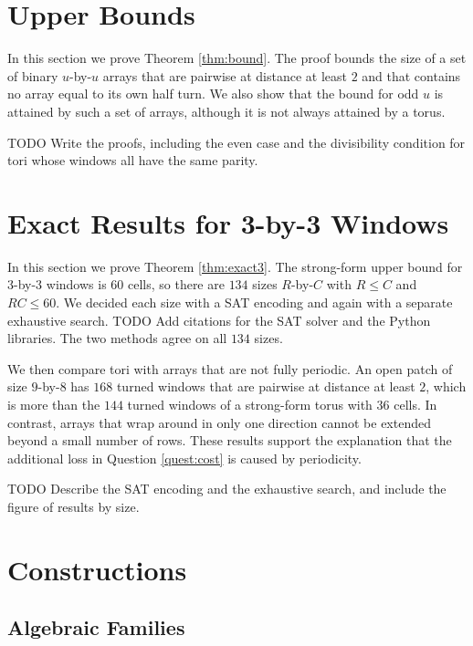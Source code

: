 \documentclass{lipics-v2021}
\newcommand{\todo}[1]{{\color{blue}TODO #1}}
\begin{document}
\section{Upper Bounds}
\label{sec:bounds}

In this section we prove Theorem \ref{thm:bound}.
The proof bounds the size of a set of binary $u$-by-$u$ arrays that are pairwise at distance at least $2$ and that contains no array equal to its own half turn.
We also show that the bound for odd $u$ is attained by such a set of arrays, although it is not always attained by a torus.

\todo{Write the proofs, including the even case and the divisibility condition for tori whose windows all have the same parity.}


\section{Exact Results for 3-by-3 Windows}
\label{sec:exact}

In this section we prove Theorem \ref{thm:exact3}.
The strong-form upper bound for $3$-by-$3$ windows is $60$ cells, so there are $134$ sizes $R$-by-$C$ with $R \leq C$ and $RC \leq 60$.
We decided each size with a SAT encoding and again with a separate exhaustive search.
\todo{Add  citations for the SAT solver and the Python libraries.}
The two methods agree on all $134$ sizes.

We then compare tori with arrays that are not fully periodic.
An open patch of size $9$-by-$8$ has $168$ turned windows that are pairwise at distance at least $2$, which is more than the $144$ turned windows of a strong-form torus with $36$ cells.
In contrast, arrays that wrap around in only one direction cannot be extended beyond a small number of rows.
These results support the explanation that the additional loss in Question \ref{quest:cost} is caused by periodicity.

\todo{Describe the SAT encoding and the exhaustive search, and include the figure of results by size.}


\section{Constructions}
\label{sec:constructions}

\subsection{Algebraic Families}
\label{sec:constructions_families}
\end{document}
